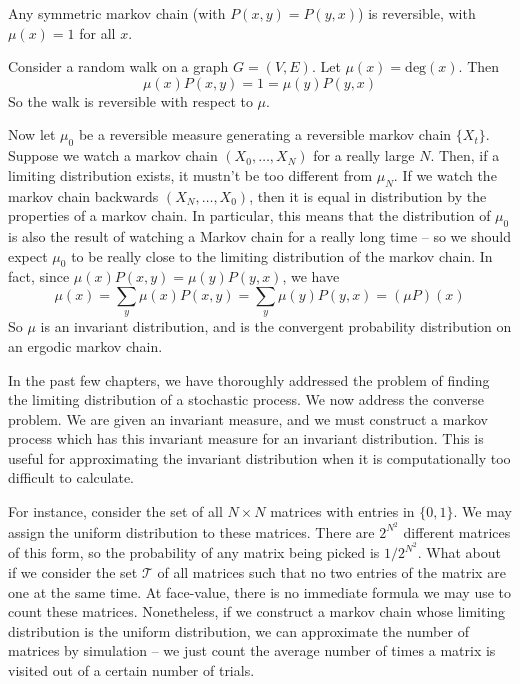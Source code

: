 \begin{example}
    Any symmetric markov chain (with $P(x,y) = P(y,x)$) is reversible, with $\mu(x) = 1$ for all $x$.
\end{example}

\begin{example}
    Consider a random walk on a graph $G = (V,E)$. Let $\mu(x) = \text{deg}(x)$. Then
    \[ \mu(x) P(x,y) = 1 = \mu(y) P(y,x) \]
    So the walk is reversible with respect to $\mu$.
\end{example}

Now let $\mu_0$ be a reversible measure  generating a reversible markov chain $\{ X_t \}$. Suppose we watch a markov chain $(X_0, \dots, X_N)$ for a really large $N$. Then, if a limiting distribution exists, it mustn't be too different from $\mu_N$. If we watch the markov chain backwards $(X_N, \dots, X_0)$, then it is equal in distribution by the properties of a markov chain. In particular, this means that the distribution of $\mu_0$ is also the result of watching a Markov chain for a really long time -- so we should expect $\mu_0$ to be really close to the limiting distribution of the markov chain. In fact, since $\mu(x) P(x,y) = \mu(y) P(y,x)$, we have
%
\[ \mu(x) = \sum_y \mu(x) P(x,y) = \sum_y \mu(y) P(y,x) = (\mu P)(x) \]
%
So $\mu$ is an invariant distribution, and is the convergent probability distribution on an ergodic markov chain.

In the past few chapters, we have thoroughly addressed the problem of finding the limiting distribution of a stochastic process. We now address the converse problem. We are given an invariant measure, and we must construct a markov process which has this invariant measure for an invariant distribution. This is useful for approximating the invariant distribution when it is computationally too difficult to calculate.

For instance, consider the set of all $N \times N$ matrices with entries in $\{0,1\}$. We may assign the uniform distribution to these matrices. There are $2^{N^2}$ different matrices of this form, so the probability of any matrix being picked is $1/2^{N^2}$. What about if we consider the set $\mathcal{T}$ of all matrices such that no two entries of the matrix are one at the same time. At face-value, there is no immediate formula we may use to count these matrices. Nonetheless, if we construct a markov chain whose limiting distribution is the uniform distribution, we can approximate the number of matrices by simulation -- we just count the average number of times a matrix is visited out of a certain number of trials.

